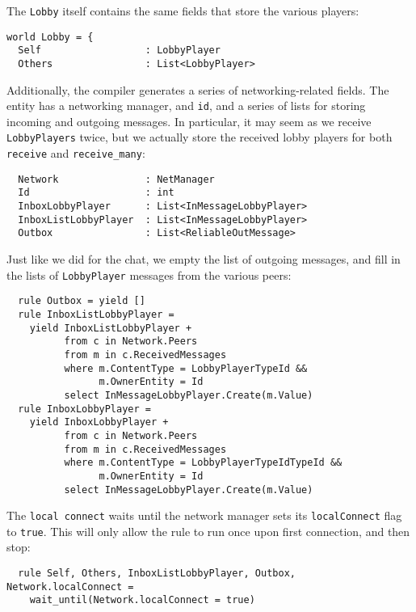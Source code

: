 The \texttt{Lobby} itself contains the same fields that store the various players:

\begin{lstlisting}
world Lobby = {
  Self                  : LobbyPlayer
  Others                : List<LobbyPlayer>
\end{lstlisting}

Additionally, the compiler generates a series of networking-related fields. The entity has a networking manager, and \texttt{id}, and a series of lists for storing incoming and outgoing messages. In particular, it may seem as we receive \texttt{LobbyPlayers} twice, but we actually store the received lobby players for both \texttt{receive} and \texttt{receive\_many}:

\begin{lstlisting}
  Network               : NetManager
  Id                    : int
  InboxLobbyPlayer      : List<InMessageLobbyPlayer>
  InboxListLobbyPlayer  : List<InMessageLobbyPlayer>
  Outbox                : List<ReliableOutMessage>
\end{lstlisting}

Just like we did for the chat, we empty the list of outgoing messages, and fill in the lists of \texttt{LobbyPlayer} messages from the various peers:

\begin{lstlisting}
  rule Outbox = yield []
  rule InboxListLobbyPlayer = 
    yield InboxListLobbyPlayer +
          from c in Network.Peers
          from m in c.ReceivedMessages
          where m.ContentType = LobbyPlayerTypeId &&
                m.OwnerEntity = Id
          select InMessageLobbyPlayer.Create(m.Value)
  rule InboxLobbyPlayer = 
    yield InboxLobbyPlayer +
          from c in Network.Peers
          from m in c.ReceivedMessages
          where m.ContentType = LobbyPlayerTypeIdTypeId &&
                m.OwnerEntity = Id
          select InMessageLobbyPlayer.Create(m.Value)
\end{lstlisting}

The \texttt{local connect} waits until the network manager sets its \texttt{localConnect} flag to \texttt{true}. This will only allow the rule to run once upon first connection, and then stop:

\begin{lstlisting}
  rule Self, Others, InboxListLobbyPlayer, Outbox, Network.localConnect =
    wait_until(Network.localConnect = true)
\end{lstlisting}

